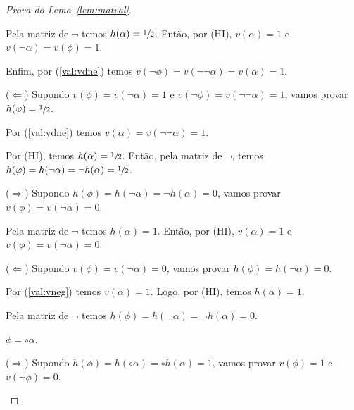 \begin{proof}[Prova do Lema~\ref{lem:matval}]
\begin{provaporcasos}
\begin{provaporsubcasos}
                            Pela matriz de $\neg$ temos $h(\alpha) = \sfrac{1}{2}{}$. Então, por (HI), $v(\alpha) = 1$ e $v(\neg \alpha) = v(\phi) = 1$.
                            
                            Enfim, por (\ref{val:vdne}) temos $v(\neg \phi) = v(\neg \neg \alpha) = v(\alpha) = 1$.
                            
                            ($\Longleftarrow$) Supondo $v(\phi) = v(\neg \alpha) = 1$ e $v(\neg \phi) = v(\neg \neg \alpha)= 1$, vamos provar $h(\varphi) = \sfrac{1}{2}{}$.

                            Por (\ref{val:vdne}) temos $v(\alpha) = v(\neg \neg \alpha) = 1$.
                            
                            Por (HI), temos $h(\alpha) = \sfrac{1}{2}{}$. Então, pela matriz de $\neg$, temos $h(\varphi) = h(\neg \alpha) = \neg h(\alpha) = \sfrac{1}{2}{}$.
                        
                            
                            ($\Longrightarrow$) Supondo $h(\phi) = h(\neg \alpha) = \neg h(\alpha) = 0$, vamos provar $v(\phi) = v(\neg \alpha) = 0$.
                            
                            Pela matriz de $\neg$ temos $h(\alpha) = 1$. Então, por (HI), $v(\alpha) = 1$ e $v(\phi) = v(\neg \alpha) = 0$.
                        
                            ($\Longleftarrow$) Supondo $v(\phi) = v(\neg \alpha) = 0$, vamos provar $h(\phi) = h(\neg \alpha) = 0$.
                        
                            Por (\ref{val:vneg}) temos $v(\alpha) = 1$. Logo, por (HI), temos $h(\alpha) = 1$.
                            
                            Pela matriz de $\neg$ temos $h(\phi) = h(\neg \alpha) = \neg h(\alpha) = 0$.
                    \end{provaporsubcasos}
                        
                \casodeprova{} $\phi = \circ \alpha$.
                        
                    \begin{provaporsubcasos}
                        

                            ($\Longrightarrow$) Supondo $h(\phi) = h(\circ \alpha) = \circ h(\alpha) = 1$, vamos provar $v(\phi) = 1$ e $v(\neg \phi) = 0$.
                            

\end{provaporsubcasos}
\end{provaporcasos}
\end{proof}
